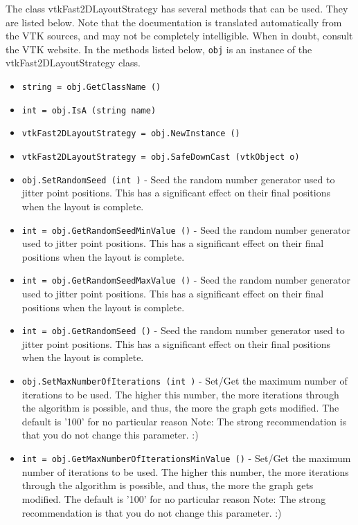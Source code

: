 The class vtkFast2DLayoutStrategy has several methods that can be used.
  They are listed below.
Note that the documentation is translated automatically from the VTK sources,
and may not be completely intelligible.  When in doubt, consult the VTK website.
In the methods listed below, \verb|obj| is an instance of the vtkFast2DLayoutStrategy class.
\begin{itemize}
\item  \verb|string = obj.GetClassName ()|

\item  \verb|int = obj.IsA (string name)|

\item  \verb|vtkFast2DLayoutStrategy = obj.NewInstance ()|

\item  \verb|vtkFast2DLayoutStrategy = obj.SafeDownCast (vtkObject o)|

\item  \verb|obj.SetRandomSeed (int )| -  Seed the random number generator used to jitter point positions.
 This has a significant effect on their final positions when
 the layout is complete.

\item  \verb|int = obj.GetRandomSeedMinValue ()| -  Seed the random number generator used to jitter point positions.
 This has a significant effect on their final positions when
 the layout is complete.

\item  \verb|int = obj.GetRandomSeedMaxValue ()| -  Seed the random number generator used to jitter point positions.
 This has a significant effect on their final positions when
 the layout is complete.

\item  \verb|int = obj.GetRandomSeed ()| -  Seed the random number generator used to jitter point positions.
 This has a significant effect on their final positions when
 the layout is complete.

\item  \verb|obj.SetMaxNumberOfIterations (int )| -  Set/Get the maximum number of iterations to be used.
 The higher this number, the more iterations through the algorithm
 is possible, and thus, the more the graph gets modified.
 The default is '100' for no particular reason
 Note: The strong recommendation is that you do not change
 this parameter. :)

\item  \verb|int = obj.GetMaxNumberOfIterationsMinValue ()| -  Set/Get the maximum number of iterations to be used.
 The higher this number, the more iterations through the algorithm
 is possible, and thus, the more the graph gets modified.
 The default is '100' for no particular reason
 Note: The strong recommendation is that you do not change
 this parameter. :)


\end{itemize}
